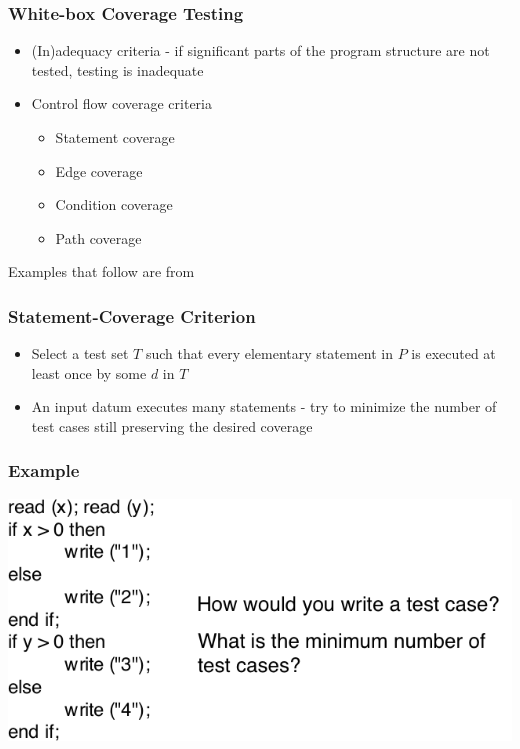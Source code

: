 \documentclass[t,12pt,numbers,fleqn]{beamer}
\begin{document}
\begin{frame}
\frametitle{White-box Coverage Testing}

\begin{itemize}
\item (In)adequacy criteria - if significant parts of the program structure are not tested, testing is inadequate
\item Control flow coverage criteria
\begin{itemize}
\item Statement coverage
\item Edge coverage
\item Condition coverage
\item Path coverage
\end{itemize}
\end{itemize}
Examples that follow are from \cite{GhezziEtAl2003}
\end{frame}


\begin{frame}
\frametitle{Statement-Coverage Criterion}

\begin{itemize}
\item Select a test set $T$ such that every elementary statement in $P$ is
  executed at least once by some $d$ in $T$
\item An input datum executes many statements - try to minimize the number of
  test cases still preserving the desired coverage
\end{itemize}

\end{frame}


\begin{frame}
\frametitle{Example}

\includegraphics[scale=0.5]{../Figures/ExampleStatementCoverageOnlyCode.png}

\end{frame}
\end{document}
